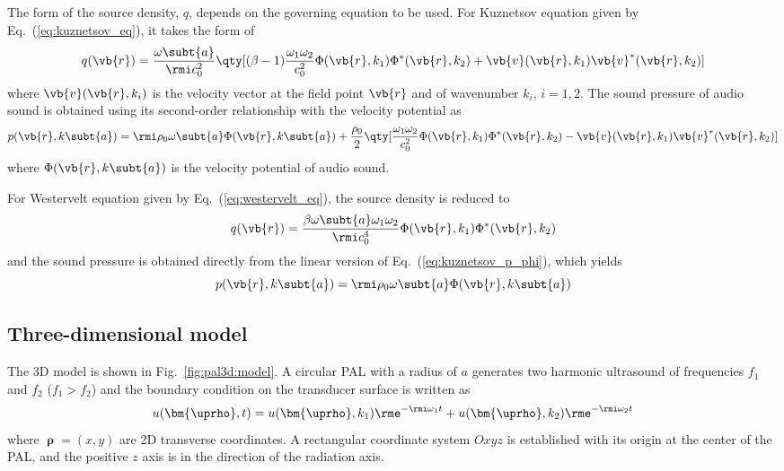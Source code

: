 The form of the source density, $q$, depends on the governing equation to be used. 
For Kuznetsov equation given by Eq.~(\ref{eq:kuznetsov_eq}), it takes the form of \cite{Cervenka2019VersatileComputationalApproach, Zhong2021FieldWesterveltFar}
\begin{equation}
    q (\vb{r})
    = \frac{\omega\subt{a}}{\rmi c_0^2}
    \qty[(\beta-1) \frac{\omega_1\omega_2}{c_0^2}\Phi(\vb{r},k_1) \Phi^*(\vb{r},k_2) + 
    \vb{v}(\vb{r},k_1)\vb{v}^*(\vb{r},k_2)]
    \label{eq:kuznetsov:source:density}
\end{equation}
where $\vb{v}(\vb{r},k_i)$ is the velocity vector at the field point $\vb{r}$ and of wavenumber $k_i$, $i=1,2$.
The sound pressure of audio sound is obtained using its second-order relationship with the velocity potential as \cite{Cervenka2019VersatileComputationalApproach}
\begin{equation}
    p(\vb{r}, k\subt{a})
    =
    \rmi  \rho_0\omega\subt{a} \Phi(\vb{r},k\subt{a})
    + \frac{\rho_0}{2}\qty[\frac{\omega_1\omega_2}{c_0^2}\Phi(\vb{r},k_1)\Phi^*(\vb{r},k_2) - \vb{v}(\vb{r},k_1)\vb{v}^*(\vb{r}, k_2)]
    \label{eq:kuznetsov_p_phi}
\end{equation}
where $\Phi(\vb{r},k\subt{a})$ is the velocity potential of audio sound.

For Westervelt equation given by Eq.~(\ref{eq:westervelt_eq}), the source density is reduced to \cite{Zhong2021FieldWesterveltFar}
\begin{equation}
    q(\vb{r}) = \frac{\beta \omega\subt{a} \omega_1\omega_2}{\rmi c_0^4}
    \Phi(\vb{r}, k_1)\Phi^*(\vb{r},k_2)
    \label{eq:source_density_westervelt}
\end{equation}
and the sound pressure is obtained directly from the linear version of Eq.~(\ref{eq:kuznetsov_p_phi}), which yields
\begin{equation}
    p(\vb{r},k\subt{a}) = \rmi \rho_0\omega\subt{a}\Phi(\vb{r},k\subt{a})
    \label{eq:pressure_potential_linear}
\end{equation}

\subsection{Three-dimensional model}
The 3D model is shown in Fig.~\ref{fig:pal3d:model}.
A circular PAL with a radius of $a$ generates two harmonic ultrasound of frequencies $f_1$ and $f_2$ ($f_1>f_2$) and the boundary condition on the transducer surface is written as
\begin{equation}
    u(\bm{\uprho}, t)
    =
    u(\bm{\uprho}, k_1) \rme^{-\rmi \omega_1 t}
    +
    u(\bm{\uprho},k_2) \rme^{-\rmi \omega_2 t}
    \label{eq:velocity_condition_3d}
\end{equation}
where $\bm{\uprho}= (x,y)$ are 2D transverse coordinates.
A rectangular coordinate system $Oxyz$ is established with its origin at the center of the PAL, and the positive $z$ axis is in the direction of the radiation axis.

